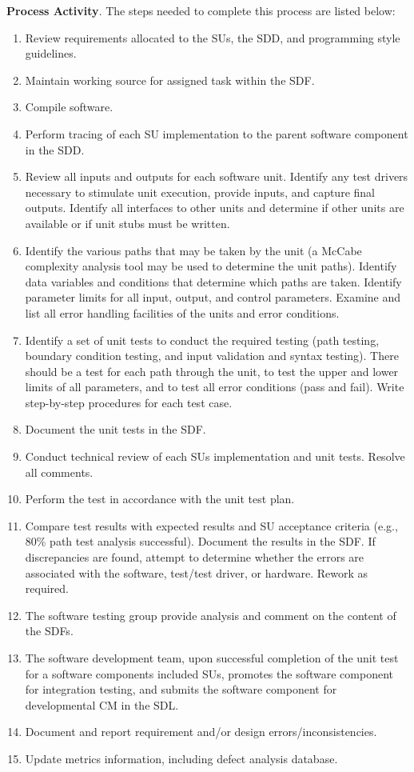 \documentclass[a4paper, 11pt]{article}
\begin{document}
\textbf{Process Activity}. The steps needed to complete this process are listed below:
\begin{enumerate}
	\item Review requirements allocated to the SUs, the SDD, and programming style guidelines.
	\item Maintain working source for assigned task within the SDF.
	\item Compile software.
	\item Perform tracing of each SU implementation to the parent software component in the SDD.
	\item Review all inputs and outputs for each software unit. Identify any test drivers necessary to stimulate unit execution, provide inputs, and capture final outputs. Identify all	interfaces to other units and determine if other units are available or if unit stubs must be written.
	\item Identify the various paths that may be taken by the unit (a McCabe complexity analysis tool may be used to determine the unit paths). Identify data variables and conditions that	determine which paths are taken. Identify parameter limits for all input, output, and control parameters. Examine and list all error handling facilities of the units and error conditions.
	\item Identify a set of unit tests to conduct the required testing (path testing, boundary condition testing, and input validation and syntax testing). There should be a test for each path through the unit, to test the upper and lower limits of all parameters, and to test all error conditions (pass and fail). Write step-by-step procedures for each test case.
	\item Document the unit tests in the SDF.
	\item Conduct technical review of each SUs implementation and unit tests. Resolve all comments.
	\item Perform the test in accordance with the unit test plan.
	\item Compare test results with expected results and SU acceptance criteria (e.g., 80\% path test analysis successful). Document the results in the SDF. If discrepancies are found, attempt to determine whether the errors are associated with the software, test/test driver,	or hardware. Rework as required.
	\item The software testing group provide analysis and comment on the content of the SDFs.
	\item The software development team, upon successful completion of the unit test for a software components included SUs, promotes the software component for integration testing, and	submits the software component for developmental CM in the SDL.
	\item Document and report requirement and/or design errors/inconsistencies.
	\item Update metrics information, including defect analysis database.
\end{enumerate}
\end{document}
